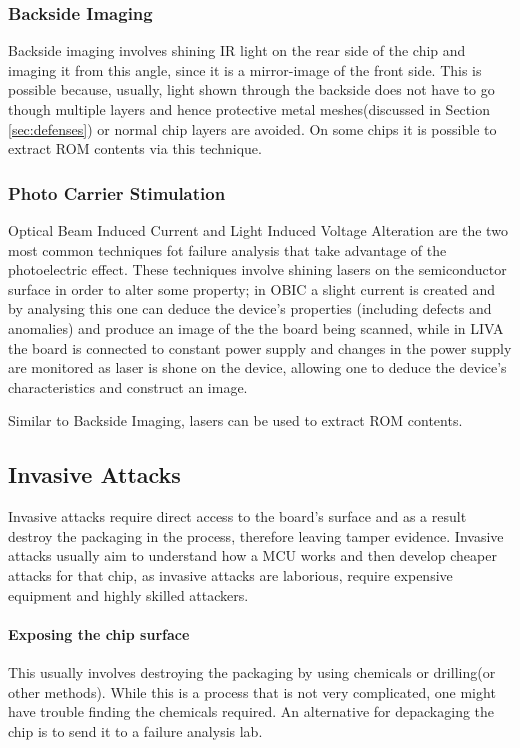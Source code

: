 \documentclass[10pt,a4paper,twocolumn]{article}
\begin{document}
	\subsubsection{Backside Imaging}
	Backside imaging involves shining IR light on the rear side of the chip and imaging it from this angle, since it is a mirror-image of the front side. This is possible because, usually, light shown through the backside does not have to go though multiple layers and hence protective metal meshes(discussed in Section \ref{sec:defenses}) or normal chip layers are avoided. On some chips it is possible to extract ROM contents via this technique.
	
	\subsubsection{Photo Carrier Stimulation}
	Optical Beam Induced Current and Light Induced Voltage Alteration are the two most common techniques fot failure analysis that take advantage of the photoelectric effect. These techniques involve shining lasers on the semiconductor surface in order to alter some property; in OBIC a slight current is created and by analysing this one can deduce the device's properties (including defects and anomalies) and produce an image of the the board being scanned, while in LIVA the board is connected to constant power supply and changes in the power supply are monitored as laser is shone on the device, allowing one to deduce the device's characteristics and construct an image.
	
	Similar to Backside Imaging, lasers can be used to extract ROM contents.
	
	\subsection{Invasive Attacks}
	Invasive attacks require direct access to the board's surface and as a result destroy the packaging in the process, therefore leaving tamper evidence. Invasive attacks usually aim to understand how a MCU works and then develop cheaper attacks for that chip, as invasive attacks are laborious, require expensive equipment and highly skilled attackers.
	
	\paragraph{Exposing the chip surface} This usually involves destroying the packaging by using chemicals or drilling(or other methods). While this is a process that is not very complicated\citep{sergei:thesis}, one might have trouble finding the chemicals required. An alternative for depackaging the chip is to send it to a failure analysis lab\citep{website:hacking_the_pic}.
	
\end{document}
